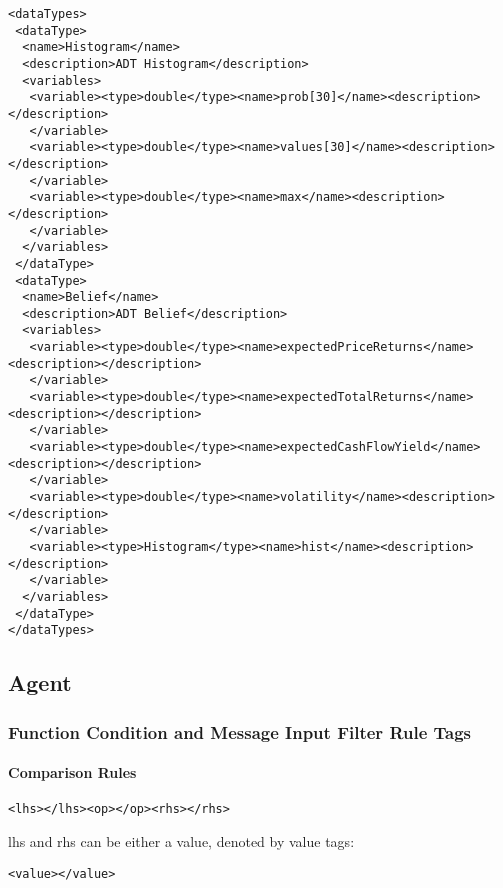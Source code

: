 \begin{mylisting}
\begin{verbatim}
<dataTypes>
 <dataType>
  <name>Histogram</name>
  <description>ADT Histogram</description>
  <variables>
   <variable><type>double</type><name>prob[30]</name><description></description>
   </variable>
   <variable><type>double</type><name>values[30]</name><description></description>
   </variable>
   <variable><type>double</type><name>max</name><description></description>
   </variable>
  </variables>
 </dataType>
 <dataType>
  <name>Belief</name>
  <description>ADT Belief</description>
  <variables>
   <variable><type>double</type><name>expectedPriceReturns</name><description></description>
   </variable>
   <variable><type>double</type><name>expectedTotalReturns</name><description></description>
   </variable>
   <variable><type>double</type><name>expectedCashFlowYield</name><description></description>
   </variable>
   <variable><type>double</type><name>volatility</name><description></description>
   </variable>
   <variable><type>Histogram</type><name>hist</name><description></description>
   </variable>
  </variables>
 </dataType>
</dataTypes>
\end{verbatim}
\end{mylisting}

\subsection{Agent}

\subsubsection{Function Condition and Message Input Filter Rule Tags}

\paragraph{Comparison Rules}

\begin{mylisting}
\begin{verbatim}
<lhs></lhs><op></op><rhs></rhs>
\end{verbatim}
\end{mylisting}

lhs and rhs can be either a value, denoted by value tags:

\begin{mylisting}
\begin{verbatim}
<value></value>
\end{verbatim}
\end{mylisting}

